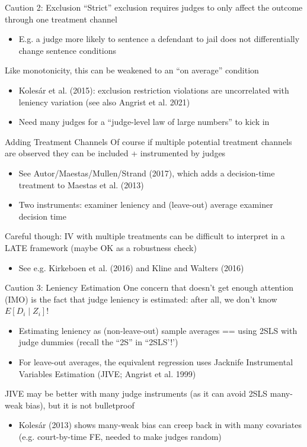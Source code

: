 \documentclass{beamer}
\begin{document}
\begin{frame}{Caution 2: Exclusion}
``Strict'' exclusion requires judges to only affect the outcome through one treatment channel\smallskip
\begin{itemize}
\item E.g. a judge more likely to sentence a defendant to jail does not differentially change sentence conditions
\end{itemize}\medskip\pause{}
Like monotonicity, this can be weakened to an ``on average'' condition\medskip
\begin{itemize}
\item Koles\'{a}r et al. (2015): exclusion restriction violations are uncorrelated with leniency variation (see also Angrist et al. 2021)\smallskip
\item Need many judges for a ``judge-level law of large numbers'' to kick in
\end{itemize}
\end{frame}

\begin{frame}{Adding Treatment Channels}
Of course if multiple potential treatment channels are observed they can be included + instrumented by judges\smallskip
\begin{itemize}
\item See Autor/Maestas/Mullen/Strand (2017), which adds a decision-time treatment to Maestas et al. (2013)\smallskip
\item Two instruments: examiner leniency and (leave-out) average examiner decision time
\end{itemize}\medskip\pause{}
Careful though: IV with multiple treatments can be difficult to interpret in a LATE framework (maybe OK as a robustness check)\smallskip
\begin{itemize}
\item See e.g. Kirkeboen et al. (2016) and Kline and Walters (2016)
\end{itemize}

\end{frame}

\begin{frame}{Caution 3: Leniency Estimation}
One concern that doesn't get enough attention (IMO) is the fact that judge leniency is estimated: after all, we don't know $E[D_i\mid Z_i]$!\smallskip\pause{}
\begin{itemize}
\item Estimating leniency as (non-leave-out) sample averages == using 2SLS with judge dummies (recall the ``2S'' in ``2SLS'!')\smallskip\pause{}
\item For leave-out averages, the equivalent regression uses Jacknife Instrumental Variables Estimation (JIVE; Angrist et al. 1999)
\end{itemize}\medskip\pause{}
JIVE may be better with many judge instruments (as it can avoid 2SLS many-weak bias), but it is not bulletproof\smallskip
\begin{itemize}
\item Koles\'{a}r (2013) shows many-weak bias can creep back in with many covariates (e.g. court-by-time FE, needed to make judges random)
\end{itemize}
\end{frame}
\end{document}
